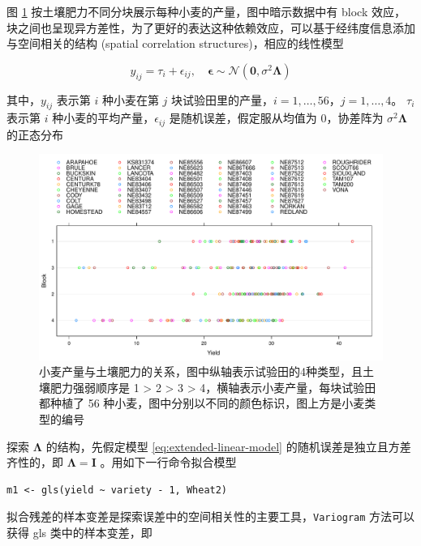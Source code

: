 \documentclass[12pt,a4paper,UTF8,twoside]{book}
\theoremstyle{definition}
\theoremstyle{definition}
\theoremstyle{definition}
\theoremstyle{remark}
\begin{document}
图 \ref{fig:yields-block}
按土壤肥力不同分块展示每种小麦的产量，图中暗示数据中有 block
效应，块之间也呈现异方差性，为了更好的表达这种依赖效应，可以基于经纬度信息添加与空间相关的结构
(spatial correlation structures)，相应的线性模型

\begin{equation}
y_{ij} = \tau_i + \epsilon_{ij}, \quad \boldsymbol{\epsilon} \sim \mathcal{N}(\mathbf{0},\sigma^2 \boldsymbol{\Lambda}) \label{eq:extended-linear-model}
\end{equation}

其中，\(y_{ij}\) 表示第 \(i\) 种小麦在第 \(j\)
块试验田里的产量，\(i = 1,\ldots,56\)，\(j = 1,\ldots,4\)。 \(\tau_i\)
表示第 \(i\) 种小麦的平均产量，\(\epsilon_{ij}\)
是随机误差，假定服从均值为 0，协差阵为 \(\sigma^2 \boldsymbol{\Lambda}\)
的正态分布

\begin{figure}

{\centering \includegraphics[width=0.9\linewidth]{figures/Yields-Block} 

}

\caption{小麦产量与土壤肥力的关系，图中纵轴表示试验田的4种类型，且土壤肥力强弱顺序是 1 > 2 > 3 > 4，横轴表示小麦产量，每块试验田都种植了 56 种小麦，图中分别以不同的颜色标识，图上方是小麦类型的编号}\label{fig:yields-block}
\end{figure}

探索 \(\boldsymbol{\Lambda}\) 的结构，先假定模型
\eqref{eq:extended-linear-model} 的随机误差是独立且方差齐性的，即
\(\boldsymbol{\Lambda} = \boldsymbol{I}\) 。用如下一行命令拟合模型

\begin{verbatim}
m1 <- gls(yield ~ variety - 1, Wheat2)
\end{verbatim}

拟合残差的样本变差是探索误差中的空间相关性的主要工具，\texttt{Variogram}
方法可以获得 gls 类中的样本变差，即
\end{document}
